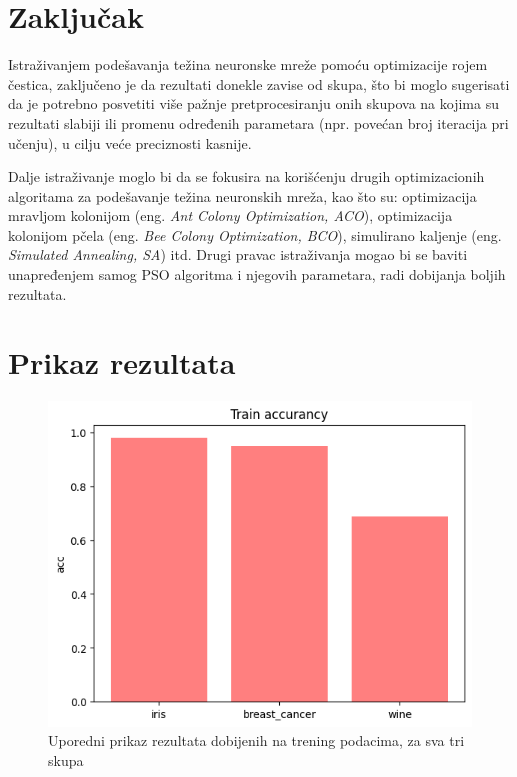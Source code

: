\documentclass[a4paper]{article}
\begin{document}
\section{Zaključak}
\label{sec:zakljucak}

Istraživanjem podešavanja težina neuronske mreže pomoću optimizacije rojem čestica, zaključeno je da rezultati donekle zavise od skupa, 
što bi moglo sugerisati da je potrebno posvetiti više pažnje pretprocesiranju onih skupova na kojima su rezultati slabiji ili promenu 
određenih parametara (npr. povećan broj iteracija pri učenju), u cilju veće preciznosti kasnije.

Dalje istraživanje moglo bi da se fokusira na korišćenju drugih optimizacionih algoritama za podešavanje težina neuronskih mreža, 
kao što su: optimizacija mravljom kolonijom (eng. \emph{Ant Colony Optimization, ACO}), optimizacija kolonijom 
pčela (eng. \emph{Bee Colony Optimization, BCO}), simulirano kaljenje (eng. \emph{Simulated Annealing, SA}) itd. Drugi pravac 
istraživanja mogao bi se baviti unapređenjem samog PSO algoritma i njegovih parametara, radi dobijanja boljih rezultata.

\appendix
 


\newpage
\appendix
\section{Prikaz rezultata}

\begin{figure}[h!]
\centering
\captionsetup{justification=centering,margin=2cm}
\begin{center}
\includegraphics[scale=0.4]{img/train.png}
\end{center}
\caption{Uporedni prikaz rezultata dobijenih na trening podacima, za sva tri skupa}
\label{fig:train_appendix}
\end{figure}
\end{document}
